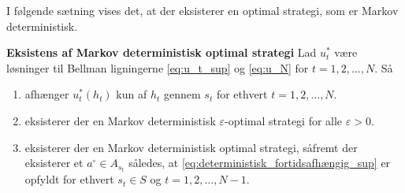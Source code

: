 I følgende sætning vises det, at der eksisterer en optimal strategi, som er Markov deterministisk.

\begin{thmx}\label{sæt:deterministisk_Markov_optimal_strategi} \textbf{Eksistens af Markov deterministisk optimal strategi} %
\newline
Lad $u_t^*$ være løsninger til Bellman ligningerne \eqref{eq:u_t_sup} og \eqref{eq:u_N} for $t=1, 2, \ldots, N$. Så
\begin{enumerate}
    \item afhænger $u_t^*(h_t)$ kun af $h_t$ gennem $s_t$ for ethvert $t=1, 2, \ldots, N$.
    \item eksisterer der en Markov deterministisk $\varepsilon$-optimal strategi for alle $\varepsilon>0$.
    \item eksisterer der en Markov deterministisk optimal strategi, såfremt der eksisterer et $a^\circ\in A_{s_t}$ således, at \eqref{eq:deterministisk_fortidsafhængig_sup} er opfyldt for ethvert $s_t\in S$ og $t=1, 2,\ldots, N-1$.
\end{enumerate}
\end{thmx}

